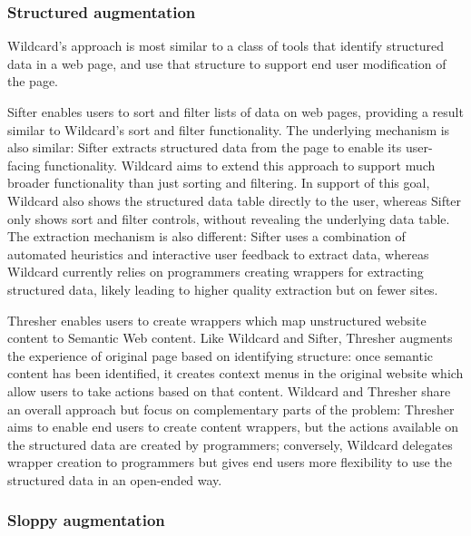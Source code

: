 \documentclass[english,submission]{programming}
\begin{document}
\hypertarget{structured-augmentation}{%
\subsubsection{Structured augmentation}\label{structured-augmentation}}

Wildcard's approach is most similar to a class of tools that identify
structured data in a web page, and use that structure to support end
user modification of the page.

Sifter \autocite{huynh2006} enables users to sort and filter lists of
data on web pages, providing a result similar to Wildcard's sort and
filter functionality. The underlying mechanism is also similar: Sifter
extracts structured data from the page to enable its user-facing
functionality. Wildcard aims to extend this approach to support much
broader functionality than just sorting and filtering. In support of
this goal, Wildcard also shows the structured data table directly to the
user, whereas Sifter only shows sort and filter controls, without
revealing the underlying data table. The extraction mechanism is also
different: Sifter uses a combination of automated heuristics and
interactive user feedback to extract data, whereas Wildcard currently
relies on programmers creating wrappers for extracting structured data,
likely leading to higher quality extraction but on fewer sites.

Thresher \autocite{hogue2005} enables users to create wrappers which map
unstructured website content to Semantic Web content. Like Wildcard and
Sifter, Thresher augments the experience of original page based on
identifying structure: once semantic content has been identified, it
creates context menus in the original website which allow users to take
actions based on that content. Wildcard and Thresher share an overall
approach but focus on complementary parts of the problem: Thresher aims
to enable end users to create content wrappers, but the actions
available on the structured data are created by programmers; conversely,
Wildcard delegates wrapper creation to programmers but gives end users
more flexibility to use the structured data in an open-ended way.

\hypertarget{sloppy-augmentation}{%
\subsubsection{Sloppy augmentation}\label{sloppy-augmentation}}
\end{document}
